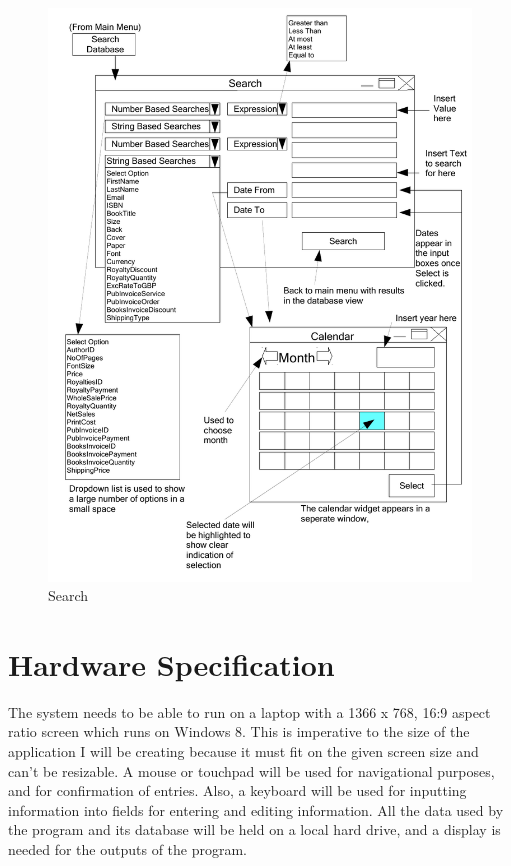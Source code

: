 \begin{figure}[H]
    \caption{Search} \label{Search.pdf}
    \includegraphics[width=\textwidth]{./Design/UserInterfaceDesign/Search.pdf}
\end{figure}


\section{Hardware Specification}

The system needs to be able to run on a laptop with a 1366 x 768, 16:9 aspect ratio screen which runs on Windows 8. This is imperative to the size of the application I will be creating because it must fit on the given screen size and can't be resizable. A mouse or touchpad will be used for navigational purposes, and for confirmation of entries. Also, a keyboard will be used for inputting information into fields for entering and editing information. All the data used by the program and its database will be held on a local hard drive, and a display is needed for the outputs of the program.


